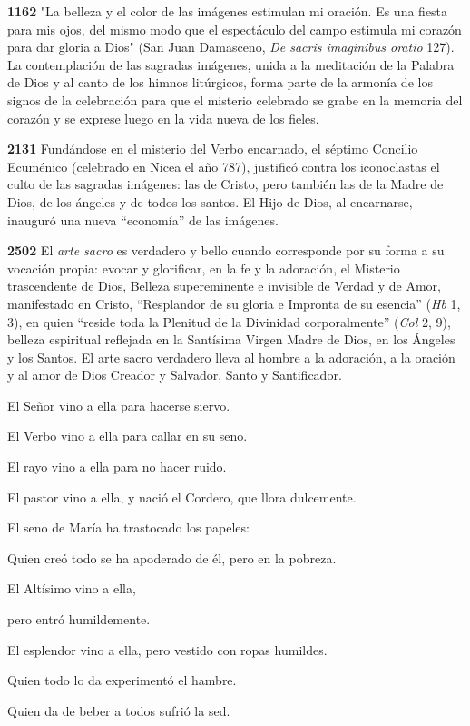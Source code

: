 \documentclass[]{article}
\begin{document}
\textbf{1162} "La belleza y el color de las imágenes estimulan mi oración. Es una fiesta para mis ojos, del mismo modo que el espectáculo del campo estimula mi corazón para dar gloria a Dios" (San Juan Damasceno, \emph{De sacris imaginibus oratio} 127). La contemplación de las sagradas imágenes, unida a la meditación de la Palabra de Dios y al canto de los himnos litúrgicos, forma parte de la armonía de los signos de la celebración para que el misterio celebrado se grabe en la memoria del corazón y se exprese luego en la vida nueva de los fieles.

\textbf{2131} Fundándose en el misterio del Verbo encarnado, el séptimo Concilio Ecuménico (celebrado en Nicea el año 787), justificó contra los iconoclastas el culto de las sagradas imágenes: las de Cristo, pero también las de la Madre de Dios, de los ángeles y de todos los santos. El Hijo de Dios, al encarnarse, inauguró una nueva ``economía'' de las imágenes.

\textbf{2502} El \emph{arte sacro} es verdadero y bello cuando
corresponde por su forma a su vocación propia: evocar y glorificar, en
la fe y la adoración, el Misterio trascendente de Dios, Belleza
supereminente e invisible de Verdad y de Amor, manifestado en Cristo,
``Resplandor de su gloria e Impronta de su esencia'' (\emph{Hb} 1, 3),
en quien ``reside toda la Plenitud de la Divinidad corporalmente''
(\emph{Col} 2, 9), belleza espiritual reflejada en la Santísima Virgen
Madre de Dios, en los Ángeles y los Santos. El arte sacro verdadero
lleva al hombre a la adoración, a la oración y al amor de Dios Creador y
Salvador, Santo y Santificador.

El Señor vino a ella para hacerse siervo.

El Verbo vino a ella para callar en su seno.

El rayo vino a ella para no hacer ruido.

El pastor vino a ella, y nació el Cordero, que llora dulcemente.

El seno de María ha trastocado los papeles:

Quien creó todo se ha apoderado de él, pero en la pobreza.

El Altísimo vino a ella,

pero entró humildemente.

El esplendor vino a ella, pero vestido con ropas humildes.

Quien todo lo da experimentó el hambre.

Quien da de beber a todos sufrió la sed.
\end{document}
